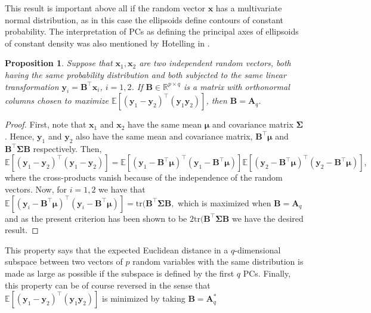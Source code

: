 \documentclass[11pt, oneside]{book}
\theoremstyle{plain}
\newtheorem{prop}{Proposition}[section]
\theoremstyle{remark}
\begin{document}
This result is important above all if the random vector $\mathbf{x}$ has a
multivariate normal distribution, as in this case the ellipsoids define contours
of constant probability. The interpretation of PCs as defining the principal
axes of ellipsoids of constant density was also mentioned by Hotelling in
\cite{hotelling1933}.
\begin{prop}\label{prop:max-expectationdistance}
    Suppose that $\mathbf{x}_1, \mathbf{x}_2$ are two independent random
    vectors, both having the same probability distribution and both subjected to
    the same linear transformation $\mathbf{y}_i = \mathbf{B}^\top\mathbf{x}_i$,
    $i=1,2$. If $\mathbf{B}\in\mathbb{R}^{p\times q}$ is a matrix with
    orthonormal columns chosen to maximize
    $\mathbb{E}[(\mathbf{y}_1-\mathbf{y}_2)^\top(\mathbf{y}_1\mathbf{y}_2)]$,
    then $\mathbf{B} = \mathbf{A}_q$.
\end{prop}    
\begin{proof}
    First, note that $\mathbf{x}_1$ and $\mathbf{x}_2$ have the same mean
    $\bm{\mu}$ and covariance matrix $\mathbf{\Sigma}$. Hence, $\mathbf{y}_1$
    and $\mathbf{y}_2$ also have the same mean and covariance matrix,
    $\mathbf{B}^\top\mathbf{\mu}$ and $\mathbf{B}^\top\mathbf{\Sigma}\mathbf{B}$
    respectively. Then,
    $$\mathbb{E}[(\mathbf{y}_1-\mathbf{y}_2)^\top(\mathbf{y}_1-\mathbf{y}_2)] =
    \mathbb{E}[(\mathbf{y}_1-
    \mathbf{B}^\top\bm{\mu})^\top(\mathbf{y}_1 - \mathbf{B}^\top\bm{\mu})] 
    \mathbb{E}[(\mathbf{y}_2-
    \mathbf{B}^\top\bm{\mu})^\top(\mathbf{y}_2 - \mathbf{B}^\top\bm{\mu})],  
    $$ where the cross-products vanish because of the independence of the random
    vectors. Now, for $i=1,2$ we have that 
    $\mathbb{E}[(\mathbf{y}_i-
    \mathbf{B}^\top\bm{\mu})^\top(\mathbf{y}_i - \mathbf{B}^\top\bm{\mu})]
    =\text{tr}(\mathbf{B}^\top\mathbf{\Sigma B},$ which is maximized when
    $\mathbf{B} = \mathbf{A}_q$ and as the present criterion has been shown to
    be $2\text{tr}(\mathbf{B}^\top\mathbf{\Sigma B}$ we have the desired result.
\end{proof}    
This property says that the expected Euclidean distance in a $q$-dimensional
subspace between two vectors of $p$ random variables with the same distribution
is made as large as possible if the subspace is defined by the first $q$ PCs.
Finally, this property can be of course reversed in the sense that
$\mathbb{E}[(\mathbf{y}_1-\mathbf{y}_2)^\top(\mathbf{y}_1\mathbf{y}_2)]$ is
minimized by taking $\mathbf{B} = \mathbf{A}_q^*$     
\end{document}
